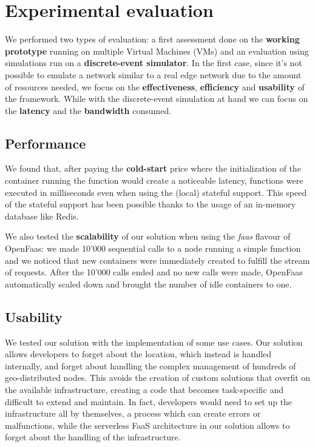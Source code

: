 \section{Experimental evaluation}
\label{sec:evaluation}

We performed two types of evaluation: a first assessment done on the \textbf{working prototype} running on multiple Virtual Machines (VMs) and an evaluation using simulations run on a \textbf{discrete-event simulator}.
In the first case, since it's not possible to emulate a network similar to a real edge network due to the amount of resources needed, we focus on the \textbf{effectiveness}, \textbf{efficiency} and \textbf{usability} of the framework.
While with the discrete-event simulation at hand we can focus on the \textbf{latency} and the \textbf{bandwidth} consumed.


\subsection{Performance}
We found that, after paying the \textbf{cold-start} price where the initialization of the container running the function would create a noticeable latency, functions were executed in milliseconds even when using the (local) stateful support. This speed of the stateful support has been possible thanks to the usage of an in-memory database like Redis.

We also tested the \textbf{scalability} of our solution when using the \textit{faas} flavour of OpenFaas: we made 10'000 sequential calls to a node running a simple function and we noticed that new containers were immediately created to fulfill the stream of requests. After the 10'000 calls ended and no new calls were made, OpenFaas automatically scaled down and brought the number of idle containers to one.


\subsection{Usability}
We tested our solution with the implementation of some use cases.
Our solution allows developers to forget about the location, which instead is handled internally, and forget about handling the complex management of hundreds of geo-distributed nodes.
This avoids the creation of custom solutions that overfit on the available infrastructure, creating a code that becomes task-specific and difficult to extend and maintain.
In fact, developers would need to set up the infrastructure all by themselves, a process which can create errors or malfunctions, while the serverless FaaS architecture in our solution allows to forget about the handling of the infrastructure.


